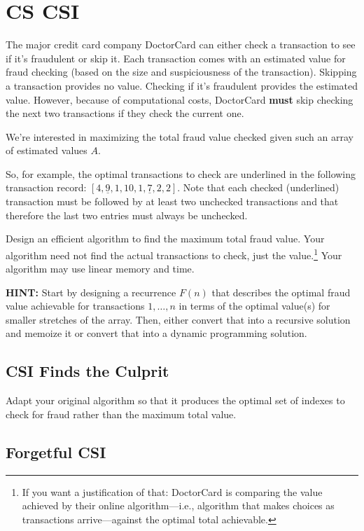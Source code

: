 \documentclass[11pt, oneside]{article}   	%
\theoremstyle{definition}
\theoremstyle{remark}
\begin{document}
\section{CS CSI}
\label{sec-2}

The major credit card company DoctorCard can either check a
transaction to see if it's fraudulent or skip it. Each transaction
comes with an estimated value for fraud checking (based on the size
and suspiciousness of the transaction). Skipping a transaction
provides no value. Checking if it's fraudulent provides the estimated
value. However, because of computational costs, DoctorCard \textbf{must} skip
checking the next two transactions if they check the current
one.

We're interested in maximizing the total fraud value checked given
such an array of estimated values $A$.

So, for example, the optimal transactions to check are underlined in
the following transaction record: $[4, \underline{9}, 1, 10, 1,
\underline{7}, 2, 2]$. Note that each checked (underlined) transaction
must be followed by at least two unchecked transactions and that
therefore the last two entries must always be unchecked.

Design an efficient algorithm to find the maximum total fraud
value. Your algorithm need not find the actual transactions to check,
just the value.\footnote{If you want a justification of that: DoctorCard is
comparing the value achieved by their online algorithm---i.e.,
algorithm that makes choices as transactions arrive---against the
optimal total achievable.
 } Your algorithm may use linear memory and
time.

\textbf{HINT:} Start by designing a recurrence $F(n)$ that describes the
optimal fraud value achievable for transactions $1,\ldots,n$ in terms
of the optimal value(s) for smaller stretches of the array. Then,
either convert that into a recursive solution and memoize it or
convert that into a dynamic programming solution.
\subsection{CSI Finds the Culprit}
\label{sec-2-1}

Adapt your original algorithm so that it produces the optimal set of indexes to
check for fraud rather than the maximum total value.
\subsection{Forgetful CSI}
\label{sec-2-2}
\end{document}
